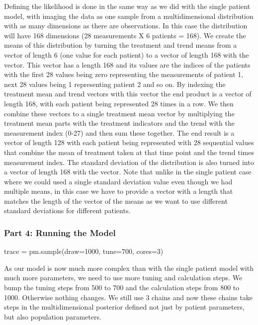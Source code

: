\documentclass[12pt,a4paper,leqno]{report}
\theoremstyle{plain}
\theoremstyle{definition}
\theoremstyle{remark}
\begin{document}
Defining the likelihood is done in the same way as we did with the single patient model,
with imaging the data as one sample from a multidimensional distribution with as many
dimensions as there are observations. In this case the
distribution will have 168 dimensions (28 measurements X 6 patients = 168). We
create the means of this distribution by turning the treatment and trend means from
a vector of length 6 (one value for each patient) to a vector of length 168 with the
 vector. This vector has a length 168 and its values are the indices of the
patients with the first 28 values being
zero representing the measurements of patient 1, next 28 values being 1 representing
patient 2 and so on. By indexing the treatment mean and trend vectors with this vector the end
product is a vector of length 168, with each patient being represented 28 times
in a row. We then combine these vectors to a single treatment mean vector by multiplying
the treatment mean parts with the treatment indicators and the trend with the
measurement index (0-27) and then sum these together. The end result is a
vector of length 128 with each patient being represented with 28 sequential values that
combine the mean of treatment taken at that time point and the trend times measurement index. The standard
deviation of the distribution is also turned into a vector of length 168 with the
 vector. Note that unlike in the single patient case where we could used a single
standard deviation value even though we had multiple means, in this case we have to
provide a vector with a length that matches the length of the vector of the means as we
want to use different standard deviations for different patients.

\subsubsection*{Part 4: Running the Model}

\bigskip
\begin{pyverbatim}[][fontsize=\footnotesize]
    trace = pm.sample(draw=1000, tune=700, cores=3)
\end{pyverbatim}
\bigskip

As our model is now much more complex than with the single patient model with much
more parameters, we need to use more tuning and calculation steps.
We bump the tuning steps from 500 to 700 and the calculation steps from 800 to 1000.
Otherwise nothing changes. We still use 3 chains and now these chains take
steps in the multidimensional posterior defined not just by patient parameters, but also
population parameters.
\end{document}
